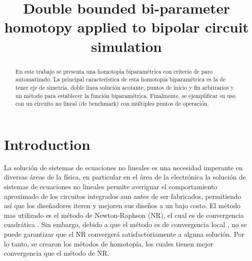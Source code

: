 \documentclass[conference,letterpaper,onecolumn]{IEEEtran}
\begin{document}
\title{Double bounded bi-parameter homotopy applied to bipolar circuit simulation}

\author{
\and
{}
\and
{}
\and
{}
}

\maketitle

\begin{abstract}

En este trabajo se presenta una homotopia biparam\'etrica con criterio de paro automatizado.
La principal característica de esta homotopia biparam\'etrica es la de tener eje de simetría, doble l{\'i}nea
solución acotante, puntos de inicio y fin arbitrarios y un método para establecer la función biparam\'etrica.  Finalmente,
se ejemplificar su uso con un circuito no lineal (de benchmark) con múltiples puntos de operación.

\end{abstract}
 

\section{Introduction}

La solución de sistemas de ecuaciones no lineales es una necesidad imperante en diversas áreas de la física, en particular 
en el área de la electrónica la solución de sistemas de ecuaciones no lineales permite averiguar el
comportamiento aproximado de los circuitos integrados aun antes de ser fabricados, permitiendo así que los diseñadores
iteren y mejoren sus diseños a un bajo costo. El método mas utilizado es el método de Newton-Raphson (NR), el cual
es de convergencia cuadrática \cite{homo_ogrodzki,cont_quasi}. Sin embargo, debido a que el método es de convergencia local \cite{cont_quasi,Schwa_book}, no se puede garantizar que
el NR convergerá satisfactoriamente a alguna solución.  Por lo tanto, se crearon los métodos de homotopía, los cuales
tienen mejor convergencia que el método de NR.
\end{document}
